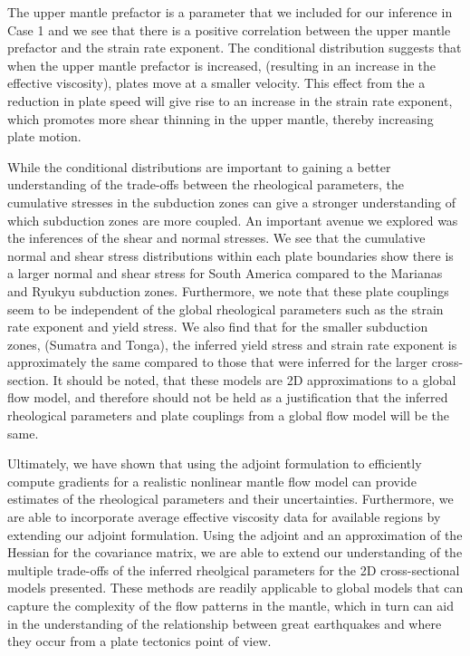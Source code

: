 \documentclass[12pt]{article}
\begin{document}
The upper mantle prefactor is a parameter that we included for our inference in Case 1 and we see that there is a positive correlation between the upper mantle prefactor and the strain rate exponent. The conditional distribution suggests that when the upper mantle prefactor is increased, (resulting in an increase in the effective viscosity), plates move at a smaller velocity. This  effect from the a reduction in plate speed will give rise to an increase in the strain rate exponent, which promotes more shear thinning in the upper mantle, thereby increasing plate motion.


While the conditional distributions are important to gaining a better understanding of the trade-offs between the rheological parameters, the cumulative stresses in the subduction zones can give a stronger understanding of which subduction zones are more coupled. An important avenue we explored was the inferences of the shear and normal stresses. We see that the cumulative normal and shear stress distributions within each plate boundaries show there is a larger normal and shear stress for South America compared to the Marianas and Ryukyu subduction zones. Furthermore, we note that these plate couplings seem to be independent of the global rheological parameters such as the strain rate exponent and yield stress.  We also find that for the smaller subduction zones, (Sumatra and Tonga), the inferred yield stress and strain rate exponent is approximately the same compared to those that were inferred for the larger cross-section. It should be noted, that these models are 2D approximations to a global flow model, and therefore should not be held as a justification that the inferred rheological parameters and plate couplings from a global flow model will be the same.

Ultimately, we have shown that using the adjoint formulation to efficiently compute gradients for a realistic nonlinear mantle flow model can provide estimates of the rheological parameters and their uncertainties. Furthermore, we are able to incorporate average effective viscosity data for available regions by extending our adjoint formulation. Using the adjoint and an approximation of the Hessian for the covariance matrix, we are able to extend our understanding of the multiple trade-offs of the inferred rheolgical parameters for the 2D cross-sectional models presented. These methods are readily applicable to global models that can capture the complexity of the flow patterns in the mantle, which in turn can aid in the understanding of the relationship between great earthquakes and where they occur from a plate tectonics point of view.
\end{document}
